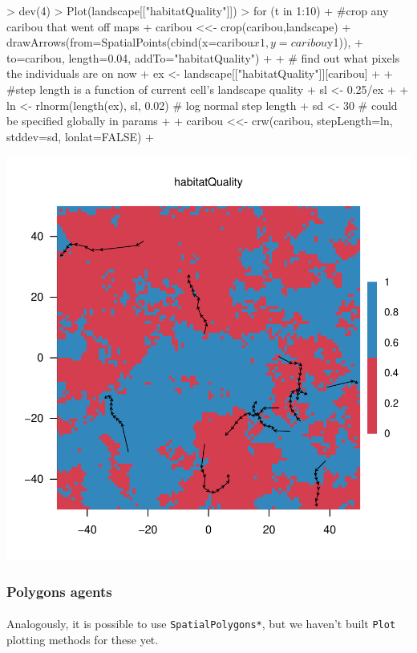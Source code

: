 \documentclass{article}
\begin{document}
\begin{Schunk}
\begin{Sinput}
> dev(4)
> Plot(landscape[["habitatQuality"]])
> for (t in 1:10) {
+   #crop any caribou that went off maps
+   caribou <<- crop(caribou,landscape)
+   drawArrows(from=SpatialPoints(cbind(x=caribou$x1, y=caribou$y1)),
+              to=caribou, length=0.04, addTo="habitatQuality")
+ 
+   # find out what pixels the individuals are on now
+   ex <- landscape[["habitatQuality"]][caribou]
+ 
+   #step length is a function of current cell's landscape quality
+   sl <- 0.25/ex
+ 
+   ln <- rlnorm(length(ex), sl, 0.02) # log normal step length
+   sd <- 30 # could be specified globally in params
+ 
+   caribou <<- crw(caribou, stepLength=ln, stddev=sd, lonlat=FALSE)
+ }
\end{Sinput}
\end{Schunk}
\includegraphics{introduction-agent-crw-trajectory}

\subsubsection{Polygons agents}

\paragraph{}
Analogously, it is possible to use \texttt{SpatialPolygons*}, but we haven't built \texttt{Plot} plotting methods for these yet.
\end{document}
